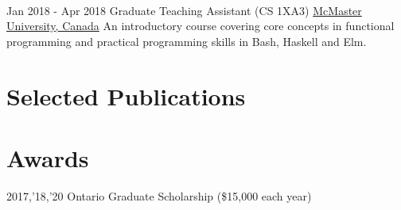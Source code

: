 \documentclass[letterpaper]{twentysecondcv} %
\begin{document}
\begin{twenty}
{\begin{itemize}
\begin{itemize}
      \end{itemize}
    \end{itemize}
  }
  \\
  \twentyitem
  {Jan 2018 -}
  {Apr 2018}
  {Graduate Teaching Assistant (CS 1XA3)}
  {\href{https://www.mcmaster.ca/}{McMaster University, Canada}}
  {}
  {An introductory course covering core concepts in functional programming and practical programming skills in Bash, Haskell and Elm.
}
\end{twenty}
\section{Selected Publications}
\vspace{-.5em}
\printbibliography[heading=none]
\section{Awards}

\vspace{-.5em}
\begin{twenty}
  \twentyitem
  {2017,'18,'20}
  {}
  {Ontario Graduate Scholarship \textnormal{(\$15,000 each year)}}
	{}
	{}
	{}
%
%	
\end{twenty}
\end{document}
